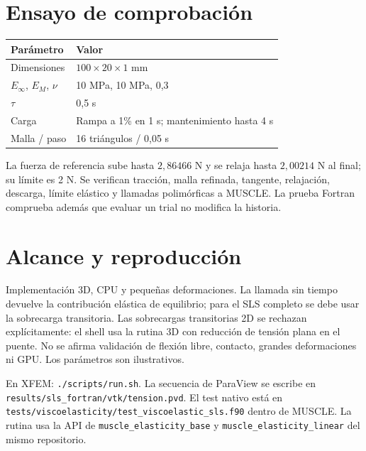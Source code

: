 \documentclass[10pt,a4paper]{article}
\begin{document}
\section*{Ensayo de comprobación}
\begin{center}
\begin{tabular}{ll}\toprule
Parámetro & Valor\\\midrule
Dimensiones & $100\times20\times1$ mm\\
$E_\infty$, $E_M$, $\nu$ & 10 MPa, 10 MPa, 0,3\\
$\tau$ & 0,5 s\\
Carga & Rampa a 1\% en 1 s; mantenimiento hasta 4 s\\
Malla / paso & 16 triángulos / 0,05 s\\\bottomrule
\end{tabular}
\end{center}
La fuerza de referencia sube hasta $2{,}86466$ N y se relaja hasta $2{,}00214$ N
al final; su límite es 2 N. Se verifican tracción, malla refinada, tangente,
relajación, descarga, límite elástico y llamadas polimórficas a MUSCLE. La prueba
Fortran comprueba además que evaluar un trial no modifica la historia.

\section*{Alcance y reproducción}
Implementación 3D, CPU y pequeñas deformaciones. La llamada sin tiempo devuelve
la contribución elástica de equilibrio; para el SLS completo se debe usar la
sobrecarga transitoria. Las sobrecargas transitorias 2D se rechazan explícitamente:
el shell usa la rutina 3D con reducción de tensión plana en el puente.
No se afirma validación de flexión libre, contacto, grandes deformaciones ni GPU.
Los parámetros son ilustrativos.

En XFEM: \texttt{./scripts/run.sh}. La secuencia de ParaView se escribe en
\texttt{results/sls\_fortran/vtk/tension.pvd}. El test nativo está en
\texttt{tests/viscoelasticity/test\_viscoelastic\_sls.f90} dentro de MUSCLE.
La rutina usa la API de \texttt{muscle\_elasticity\_base} y
\texttt{muscle\_elasticity\_linear} del mismo repositorio.
\end{document}
